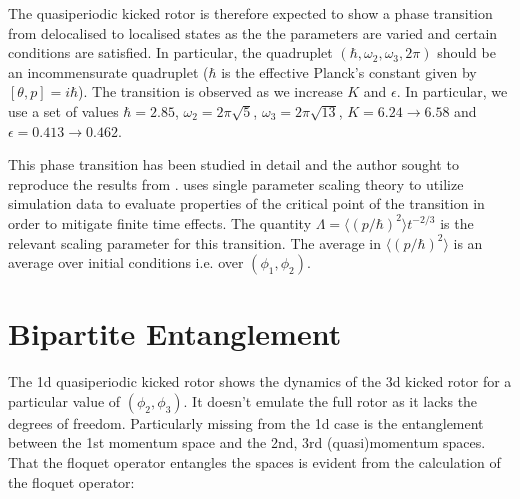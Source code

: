 \documentclass[twocolumn,nobalancelastpage]{report}
\begin{document}
The quasiperiodic kicked rotor is therefore expected to show a
phase transition from delocalised to localised states as the
the parameters are varied and certain conditions are satisfied.
In particular, the quadruplet $(\hbar, \omega_2, \omega_3, 2\pi)$
should be an incommensurate quadruplet ($\hbar$ is the effective
Planck's constant given by $[\theta, p] = i\hbar$). The transition
is observed as we increase $K$ and $\epsilon$. In particular, we use
a set of values $\hbar =  2.85$, $\omega_2 = 2\pi\sqrt{5}$,
$\omega_3 = 2\pi\sqrt{13}$, $K = 6.24 \to 6.58$ and
$\epsilon = 0.413 \to 0.462$. \cite{lemarie_universality_2009}

This phase transition has been studied in detail and the author
sought to reproduce the results from \cite{lemarie_universality_2009}.
\cite{lemarie_universality_2009} uses single parameter scaling theory
to utilize simulation data to evaluate properties of the critical
point of the transition in order to mitigate finite time effects.
The quantity $\Lambda = \langle (p/\hbar)^2 \rangle t^{-2/3}$ is
the relevant scaling parameter for this transition. The average in
$\langle (p/\hbar)^2 \rangle$ is an average over initial conditions
i.e. over $(\phi_1, \phi_2)$.

\section{Bipartite Entanglement}
The 1d quasiperiodic kicked rotor shows the dynamics of the 3d kicked
rotor for a particular value of $(\phi_2,\phi_3)$. It doesn't emulate
the full rotor as it lacks the degrees of freedom. Particularly missing
from the 1d case is the entanglement between the 1st momentum space and
the 2nd, 3rd (quasi)momentum spaces. That the floquet operator entangles
the spaces is evident from the calculation of the floquet operator:
\end{document}
